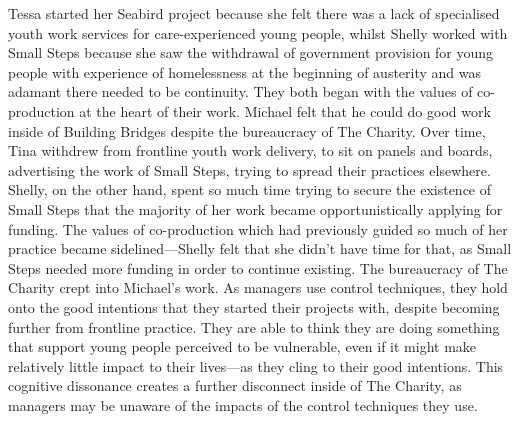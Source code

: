 Tessa started her Seabird project because she felt there was a lack of specialised youth work services for care-experienced young people, whilst Shelly worked with Small Steps because she saw the withdrawal of government provision for young people with experience of homelessness at the beginning of austerity and was adamant there needed to be continuity. They both began with the values of co-production at the heart of their work. Michael felt that he could do good work inside of Building Bridges despite the bureaucracy of The Charity. Over time, Tina withdrew from frontline youth work delivery, to sit on panels and boards, advertising the work of Small Steps, trying to spread their practices elsewhere. Shelly, on the other hand, spent so much time trying to secure the existence of Small Steps that the majority of her work became opportunistically applying for funding. The values of co-production which had previously guided so much of her practice became sidelined—Shelly felt that she didn't have time for that, as Small Steps needed more funding in order to continue existing. The bureaucracy of The Charity crept into Michael's work. As managers use control techniques, they hold onto the good intentions that they started their projects with, despite becoming further from frontline practice. They are able to think they are doing something that support young people perceived to be vulnerable, even if it might make relatively little impact to their lives—as they cling to their good intentions. This cognitive dissonance creates a further disconnect inside of The Charity, as managers may be unaware of the impacts of the control techniques they use. 







